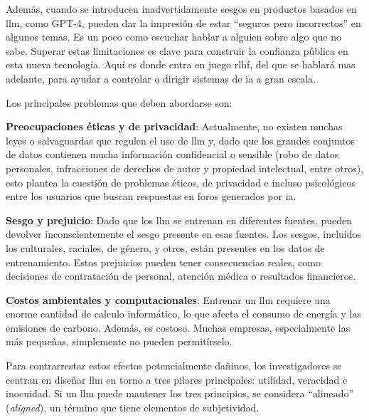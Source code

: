 Además, cuando se introducen inadvertidamente sesgos en productos basados en \acrshort{llm}, como GPT-4, pueden dar la impresión de estar ``seguros pero incorrectos'' en algunos temas. Es un poco como escuchar hablar a alguien sobre algo que no sabe. Superar estas limitaciones es clave para construir la confianza pública en esta nueva tecnología. Aquí es donde entra en juego \acrshort{rlhf}, del que se hablará mas adelante, para ayudar a controlar o dirigir sistemas de \acrlong{ia} a gran escala.

Los principales problemas que deben abordarse son:

\begin{description}  

\item \textbf{Preocupaciones éticas y de privacidad}: Actualmente, no existen muchas leyes o salvaguardas que regulen el uso de \acrshort{llm} y, dado que los grandes conjuntos de datos contienen mucha información confidencial o sensible (robo de datos personales, infracciones de derechos de autor y propiedad intelectual, entre otros), esto plantea la cuestión de problemas éticos, de privacidad e incluso psicológicos entre los usuarios que buscan respuestas en foros generados por \acrlong{ia}.

\item \textbf{Sesgo y prejuicio}: Dado que los \acrshort{llm} se entrenan en diferentes fuentes, pueden devolver inconscientemente el sesgo presente en esas fuentes. Los sesgos, incluidos los culturales, raciales, de género, y otros, están presentes en los datos de entrenamiento. Estos prejuicios pueden tener consecuencias reales, como decisiones de contratación de personal, atención médica o resultados financieros.

\item \textbf{Costos ambientales y computacionales}: Entrenar un \acrlong{llm} requiere una enorme cantidad de calculo informático, lo que afecta el consumo de energía y las emisiones de carbono. Además, es costoso. Muchas empresas, especialmente las más pequeñas, simplemente no pueden permitírselo.
\end{description}

Para contrarrestar estos efectos potencialmente dañinos, los investigadores se centran en diseñar \acrshort{llm} en torno a tres pilares principales: utilidad, veracidad e inocuidad. Si un \acrshort{llm} puede mantener los tres principios, se considera ``alineado'' (\textit{aligned}), un término que tiene elementos de subjetividad.

